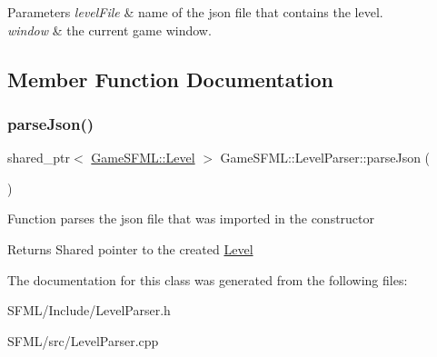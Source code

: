 \begin{DoxyParams}{Parameters}
{\em level\+File} & name of the json file that contains the level. \\
\hline
{\em window} & the current game window. \\
\hline
\end{DoxyParams}


\subsection{Member Function Documentation}
\mbox{\label{classGameSFML_1_1LevelParser_a11eb8b7c40e1dad49b88de4d5c05bdbf}} 
\subsubsection{\texorpdfstring{parse\+Json()}{parseJson()}}
{\footnotesize\ttfamily shared\+\_\+ptr$<$ \hyperlink{classGameSFML_1_1Level}{Game\+S\+F\+M\+L\+::\+Level} $>$ Game\+S\+F\+M\+L\+::\+Level\+Parser\+::parse\+Json (\begin{DoxyParamCaption}{ }\end{DoxyParamCaption})}

Function parses the json file that was imported in the constructor \begin{DoxyReturn}{Returns}
Shared pointer to the created \hyperlink{classGameSFML_1_1Level}{Level} 
\end{DoxyReturn}


The documentation for this class was generated from the following files\+:\begin{DoxyCompactItemize}
\item 
S\+F\+M\+L/\+Include/Level\+Parser.\+h\item 
S\+F\+M\+L/src/Level\+Parser.\+cpp\end{DoxyCompactItemize}
